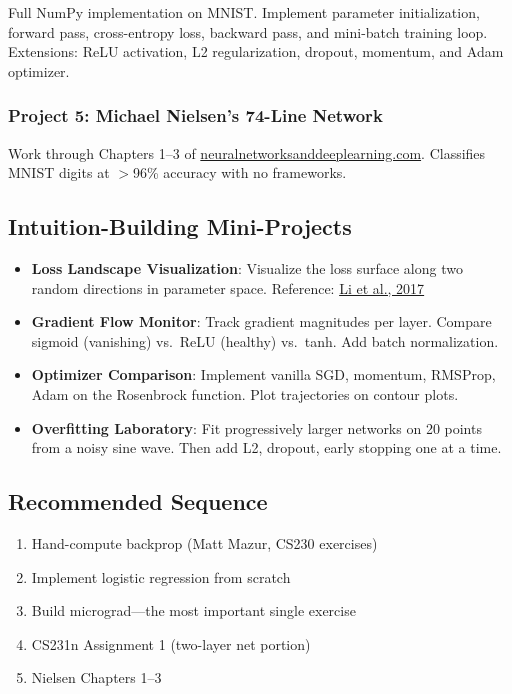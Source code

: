 \documentclass[11pt,letterpaper]{article}
\begin{document}
Full NumPy implementation on MNIST. Implement parameter initialization, forward pass, cross-entropy loss, backward pass, and mini-batch training loop. Extensions: ReLU activation, L2 regularization, dropout, momentum, and Adam optimizer.

\subsubsection{Project 5: Michael Nielsen's 74-Line Network}

Work through Chapters 1--3 of \href{http://neuralnetworksanddeeplearning.com/}{neuralnetworksanddeeplearning.com}. Classifies MNIST digits at $>$96\% accuracy with no frameworks.

\subsection{Intuition-Building Mini-Projects}

\begin{itemize}[nosep]
    \item \textbf{Loss Landscape Visualization}: Visualize the loss surface along two random directions in parameter space. Reference: \href{https://arxiv.org/abs/1712.09913}{Li et al., 2017}
    \item \textbf{Gradient Flow Monitor}: Track gradient magnitudes per layer. Compare sigmoid (vanishing) vs.\ ReLU (healthy) vs.\ tanh. Add batch normalization.
    \item \textbf{Optimizer Comparison}: Implement vanilla SGD, momentum, RMSProp, Adam on the Rosenbrock function. Plot trajectories on contour plots.
    \item \textbf{Overfitting Laboratory}: Fit progressively larger networks on 20 points from a noisy sine wave. Then add L2, dropout, early stopping one at a time.
\end{itemize}

\subsection{Recommended Sequence}

\begin{enumerate}[nosep]
    \item Hand-compute backprop (Matt Mazur, CS230 exercises)
    \item Implement logistic regression from scratch
    \item Build micrograd---the most important single exercise
    \item CS231n Assignment 1 (two-layer net portion)
    \item Nielsen Chapters 1--3
\end{enumerate}
\end{document}
